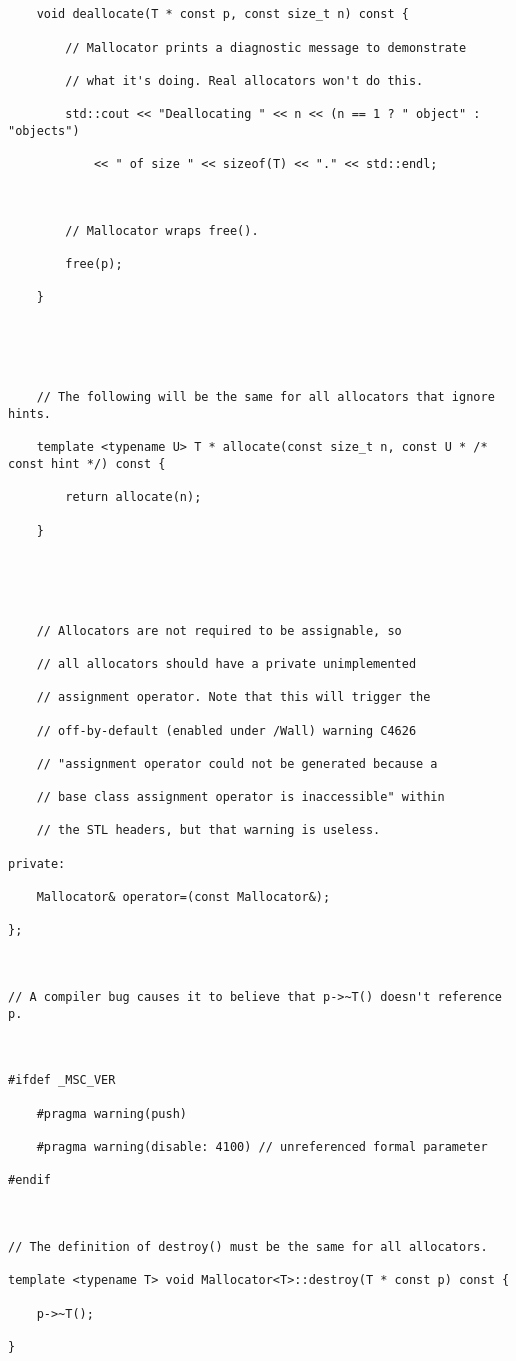 {\begin{lstlisting}
 

    void deallocate(T * const p, const size_t n) const {

        // Mallocator prints a diagnostic message to demonstrate

        // what it's doing. Real allocators won't do this.

        std::cout << "Deallocating " << n << (n == 1 ? " object" : "objects")

            << " of size " << sizeof(T) << "." << std::endl;

 

        // Mallocator wraps free().

        free(p);

    }

 

 

    // The following will be the same for all allocators that ignore hints.

    template <typename U> T * allocate(const size_t n, const U * /* const hint */) const {

        return allocate(n);

    }

 

 

    // Allocators are not required to be assignable, so

    // all allocators should have a private unimplemented

    // assignment operator. Note that this will trigger the

    // off-by-default (enabled under /Wall) warning C4626

    // "assignment operator could not be generated because a

    // base class assignment operator is inaccessible" within

    // the STL headers, but that warning is useless.

private:

    Mallocator& operator=(const Mallocator&);

};

 

// A compiler bug causes it to believe that p->~T() doesn't reference p.

 

#ifdef _MSC_VER

    #pragma warning(push)

    #pragma warning(disable: 4100) // unreferenced formal parameter

#endif

 

// The definition of destroy() must be the same for all allocators.

template <typename T> void Mallocator<T>::destroy(T * const p) const {

    p->~T();

}
\end{lstlisting}
}

